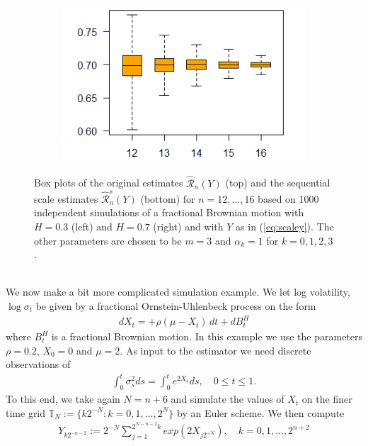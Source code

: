 \documentclass{article}
\begin{document}
\begin{figure}[htbp]
\begin{subfigure}{0.48\textwidth}
    \end{subfigure}
    \hfill
    \begin{subfigure}{0.48\textwidth}
        \includegraphics[width=\linewidth]{box2.png}
    \end{subfigure}
    
    \caption{Box plots of the original estimates $\hat{\mathscr{R}}_n (Y)$ (top) and the sequential scale estimates $\hat{\mathscr{R}}_n^s (Y)$ (bottom) for $n=12,...,16$ based on 1000 independent simulations of a fractional Brownian motion with $H=0.3$ (left) and $H=0.7$ (right) and with $Y$ as in (\ref{eq:scaley}). The other parameters are chosen to be $m=3$ and $\alpha_k = 1$ for $k=0,1,2,3$.} \label{fig:scaleplot}
\end{figure}\\
We now make a bit more complicated simulation example. We let log volatility, $\log\sigma_t$ be given by a fractional Ornstein-Uhlenbeck process on the form 
\begin{align}
dX_t = +\rho(\mu - X_t) \, dt + dB^H_t\label{eq:scale_fou}
\end{align}
where $B^H_t$ is a fractional Brownian motion. In this example we use the parameters $\rho=0.2$, $X_0=0$ and $\mu=2$. As input to the estimator we need discrete observations of 
\begin{align*}
\int_0^t \sigma^2_s ds = \int_0^t e^{2X_s} ds, \quad 0\leq t \leq 1.
\end{align*}
To this end, we take again $N=n+6$ and simulate the values of $X_t$ on the finer time grid $\mathbb{T}_{N}:= \{k 2^{-N} : k=0,1,...,2^{N}\}$ by an Euler scheme. We then compute
\begin{align}
Y_{k2^{-n-2}}:= 2^{-N} \sum_{j=1}^{2^{N-n-2}k} exp\left(2X_{j2^{-N}}\right), \quad k=0,1,...,2^{n+2} \label{eq:scaley_fou}
\end{align} 
\end{document}
